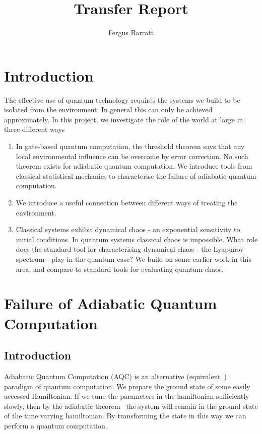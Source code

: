 \documentclass{article}
\title{Transfer Report}
\author{Fergus Barratt}
\begin{document}
\maketitle
\section{Introduction}
The effective use of quantum technology requires the systems we build to be isolated from the environment.
In general this can only be achieved approximately.
In this project, we investigate the role of the world at large in three different ways
\begin{enumerate}
    \item In gate-based quantum computation, the threshold theorem says that any local environmental influence can be overcome by error correction.
          No such theorem exists for adiabatic quantum computation. 
          We introduce tools from classical statistical mechanics to characterise the failure of adiabatic quantum computation.
    \item We introduce a useful connection between different ways of treating the environment.
    \item Classical systems exhibit dynamical chaos - an exponential sensitivity to initial conditions. 
          In quantum systems classical chaos is impossible.
          What role does the standard tool for characterising dynamical chaos - the Lyapunov spectrum - play in the quantum case?
          We build on some earlier work in this area, and compare to standard tools for evaluating quantum chaos.
\end{enumerate}
%
\section{Failure of Adiabatic Quantum Computation}\label{sec:failure}
\subsection{Introduction}
%
Adiabatic Quantum Computation (AQC) is an alternative (equivalent~\cite{Aharonov2004}) paradigm of quantum computation.
We prepare the ground state of some easily accessed Hamiltonian.
If we tune the parameters in the hamiltonian sufficiently slowly, then by the adiabatic theorem~\cite{born1928adiabatic} the system will remain in the ground state of the time varying hamiltonian.
By transforming the state in this way we can perform a quantum computation.
\end{document}
